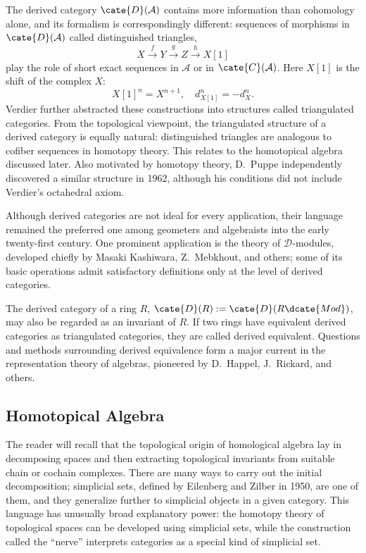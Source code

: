 The derived category $\cate{D}(\mathcal A)$ contains more information than cohomology alone, and its formalism is correspondingly different: sequences of morphisms in $\cate{D}(\mathcal A)$ called distinguished triangles,
\[ X \xrightarrow{f} Y \xrightarrow{g} Z \xrightarrow{h} X[1] \]
play the role of short exact sequences in $\mathcal A$ or in $\cate{C}(\mathcal A)$. Here $X[1]$ is the shift of the complex $X$:
\[ X[1]^n=X^{n+1},\quad d_{X[1]}^n=-d_X^n. \]
Verdier further abstracted these constructions into structures called triangulated categories. From the topological viewpoint, the triangulated structure of a derived category is equally natural: distinguished triangles are analogous to cofiber sequences in homotopy theory. This relates to the homotopical algebra discussed later. Also motivated by homotopy theory, D.\ Puppe independently discovered a similar structure in 1962, although his conditions did not include Verdier's octahedral axiom.

Although derived categories are not ideal for every application, their language remained the preferred one among geometers and algebraists into the early twenty-first century. One prominent application is the theory of $\mathscr D$-modules, developed chiefly by Masaki Kashiwara, Z.\ Mebkhout, and others; some of its basic operations admit satisfactory definitions only at the level of derived categories.

The derived category of a ring $R$, $\cate{D}(R):=\cate{D}(R\dcate{Mod})$, may also be regarded as an invariant of $R$. If two rings have equivalent derived categories as triangulated categories, they are called derived equivalent. Questions and methods surrounding derived equivalence form a major current in the representation theory of algebras, pioneered by D.\ Happel, J.\ Rickard, and others.

\subsection*{Homotopical Algebra}

The reader will recall that the topological origin of homological algebra lay in decomposing spaces and then extracting topological invariants from suitable chain or cochain complexes. There are many ways to carry out the initial decomposition; simplicial sets, defined by Eilenberg and Zilber in 1950, are one of them, and they generalize further to simplicial objects in a given category. This language has unusually broad explanatory power: the homotopy theory of topological spaces can be developed using simplicial sets, while the construction called the ``nerve'' interprets categories as a special kind of simplicial set.

